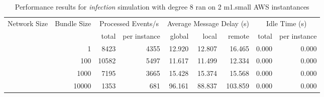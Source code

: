 \begin{table}
	  \caption[Performance results, \emph{infection:8 on 2 m1.small instances }]{ Performance results for \emph{ infection } simulation with degree 8 ran on 2 m1.small AWS instantances }
	\begin{tabular}{rrrrrrrrr}
	\hline\noalign{\smallskip}

	Network Size &
	Bundle Size &
	\multicolumn{2}{c}{Processed Events/s} & 
	\multicolumn{3}{c}{Average Message Delay (s)} & 
	\multicolumn{2}{c}{Idle Time (s)}  \\

	 & 
	 & 
	 total & per instance
     & global & local & remote
     & total & per instance\\

			
				\noalign{\smallskip}\hline
				\multirow{ 4 }{*}{ 40000 } &
				
					
					 
					\multirow{ 1 }{*}{ 1 } &
					
						
							    
							     8423  & 4355  
	                           & 12.920 & 12.807 & 16.465
	                           & 0.000 & 0.000  \\
	                
	            
					 &  
					 
					\multirow{ 1 }{*}{ 100 } &
					
						
							    
							     10582  & 5497  
	                           & 11.617 & 11.499 & 12.334
	                           & 0.000 & 0.000  \\
	                
	            
					 &  
					 
					\multirow{ 1 }{*}{ 1000 } &
					
						
							    
							     7195  & 3665  
	                           & 15.428 & 15.374 & 15.568
	                           & 0.000 & 0.000  \\
	                
	            
					 &  
					 
					\multirow{ 1 }{*}{ 10000 } &
					
						
							    
							     1353  & 681  
	                           & 96.161 & 88.837 & 103.859
	                           & 0.000 & 0.000  \\
	                

\end{tabular}
\end{table}
